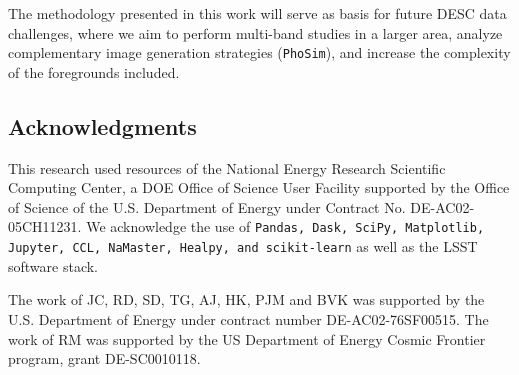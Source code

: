 \documentclass[twocolumn]{aastex62}
\begin{document}
The methodology presented in this work will serve as basis for future DESC data challenges, where we aim to perform multi-band studies in a larger area, analyze complementary image generation strategies (\texttt{PhoSim}), and increase the complexity of the foregrounds included.


\subsection*{Acknowledgments}

This research used resources of the National Energy Research Scientific Computing Center, a DOE Office of Science User Facility supported by the Office of Science of the U.S. Department of Energy under Contract No. DE-AC02-05CH11231. We acknowledge the use of \texttt{Pandas, Dask, SciPy, Matplotlib, Jupyter, CCL, NaMaster, Healpy, and scikit-learn} as well as the LSST software stack.

The work of JC, RD, SD, TG, AJ, HK, PJM and BVK was supported by the U.S. Department of Energy under contract number DE-AC02-76SF00515. 
The work of RM was supported by the US Department of Energy Cosmic Frontier program, grant DE-SC0010118.






\appendix
\end{document}
